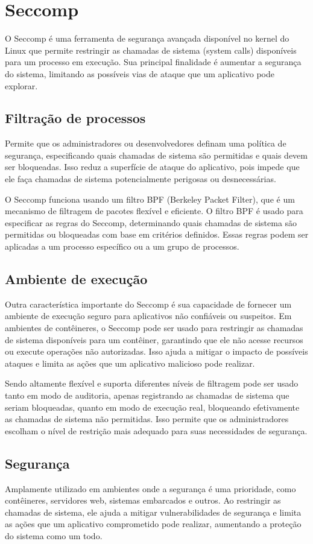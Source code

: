 \section{Seccomp}

O Seccomp é uma ferramenta de segurança avançada disponível no kernel do Linux que permite restringir as chamadas de sistema (system calls) disponíveis para um processo em execução. Sua principal finalidade é aumentar a segurança do sistema, limitando as possíveis vias de ataque que um aplicativo pode explorar.

\subsection{Filtração de processos}
 Permite que os administradores ou desenvolvedores definam uma política de segurança, especificando quais chamadas de sistema são permitidas e quais devem ser bloqueadas. Isso reduz a superfície de ataque do aplicativo, pois impede que ele faça chamadas de sistema potencialmente perigosas ou desnecessárias.

O Seccomp funciona usando um filtro BPF (Berkeley Packet Filter), que é um mecanismo de filtragem de pacotes flexível e eficiente. O filtro BPF é usado para especificar as regras do Seccomp, determinando quais chamadas de sistema são permitidas ou bloqueadas com base em critérios definidos. Essas regras podem ser aplicadas a um processo específico ou a um grupo de processos.

\subsection{Ambiente de execução}
Outra característica importante do Seccomp é sua capacidade de fornecer um ambiente de execução seguro para aplicativos não confiáveis ou suspeitos. Em ambientes de contêineres, o Seccomp pode ser usado para restringir as chamadas de sistema disponíveis para um contêiner, garantindo que ele não acesse recursos ou execute operações não autorizadas. Isso ajuda a mitigar o impacto de possíveis ataques e limita as ações que um aplicativo malicioso pode realizar.

Sendo altamente flexível e suporta diferentes níveis de filtragem pode ser usado tanto em modo de auditoria, apenas registrando as chamadas de sistema que seriam bloqueadas, quanto em modo de execução real, bloqueando efetivamente as chamadas de sistema não permitidas. Isso permite que os administradores escolham o nível de restrição mais adequado para suas necessidades de segurança.

\subsection{Segurança}
Amplamente utilizado em ambientes onde a segurança é uma prioridade, como contêineres, servidores web, sistemas embarcados e outros. Ao restringir as chamadas de sistema, ele ajuda a mitigar vulnerabilidades de segurança e limita as ações que um aplicativo comprometido pode realizar, aumentando a proteção do sistema como um todo.